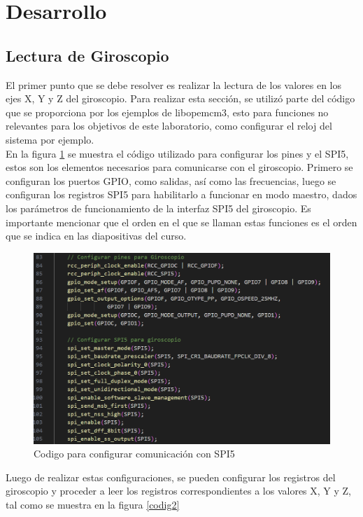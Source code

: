 \section{Desarrollo}
\subsection{Lectura de Giroscopio}
El primer punto que se debe resolver es realizar la lectura de los valores en los ejes X, Y y Z del giroscopio. Para realizar esta sección, se utilizó parte del código que se proporciona por los ejemplos de libopemcm3, esto para funciones no relevantes para los objetivos de este laboratorio, como configurar el reloj del sistema por ejemplo.\\
En la figura \ref{codig1} se muestra el código utilizado para configurar los pines y el SPI5, estos son los elementos necesarios para comunicarse con el giroscopio. Primero se configuran los puertos GPIO, como salidas, así como las frecuencias, luego se configuran los registros SPI5 para habilitarlo a funcionar en modo maestro, dados los parámetros de funcionamiento de la interfaz SPI5 del giroscopio. Es importante mencionar que el orden en el que se llaman estas funciones es el orden que se indica en las diapositivas del curso.

\begin{figure}[H]
    \centering
    \includegraphics[scale=.5]{Imagenes/codig1.png}
    \caption{Codigo para configurar comunicación con SPI5}
    \label{codig1}
\end{figure}

Luego de realizar estas configuraciones, se pueden configurar los registros del giroscopio y proceder a leer los registros correspondientes a los valores X, Y y Z, tal como se muestra en la figura \ref{codig2}

